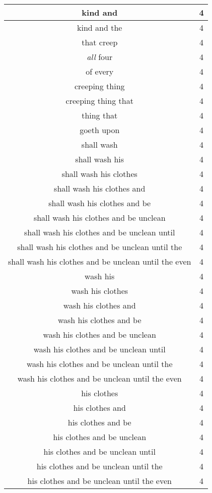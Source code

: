 \begin{center}
\begin{longtable}{|c|c|}
kind and & 4\\ \hline 
kind and the & 4\\ \hline 
that creep & 4\\ \hline 
\emph{all} four & 4\\ \hline 
of every & 4\\ \hline 
creeping thing & 4\\ \hline 
creeping thing that & 4\\ \hline 
thing that & 4\\ \hline 
goeth upon & 4\\ \hline 
shall wash & 4\\ \hline 
shall wash his & 4\\ \hline 
shall wash his clothes & 4\\ \hline 
shall wash his clothes and & 4\\ \hline 
shall wash his clothes and be & 4\\ \hline 
shall wash his clothes and be unclean & 4\\ \hline 
shall wash his clothes and be unclean until & 4\\ \hline 
shall wash his clothes and be unclean until the & 4\\ \hline 
shall wash his clothes and be unclean until the even & 4\\ \hline 
wash his & 4\\ \hline 
wash his clothes & 4\\ \hline 
wash his clothes and & 4\\ \hline 
wash his clothes and be & 4\\ \hline 
wash his clothes and be unclean & 4\\ \hline 
wash his clothes and be unclean until & 4\\ \hline 
wash his clothes and be unclean until the & 4\\ \hline 
wash his clothes and be unclean until the even & 4\\ \hline 
his clothes & 4\\ \hline 
his clothes and & 4\\ \hline 
his clothes and be & 4\\ \hline 
his clothes and be unclean & 4\\ \hline 
his clothes and be unclean until & 4\\ \hline 
his clothes and be unclean until the & 4\\ \hline 
his clothes and be unclean until the even & 4\\ \hline 

\end{longtable}
\end{center}
